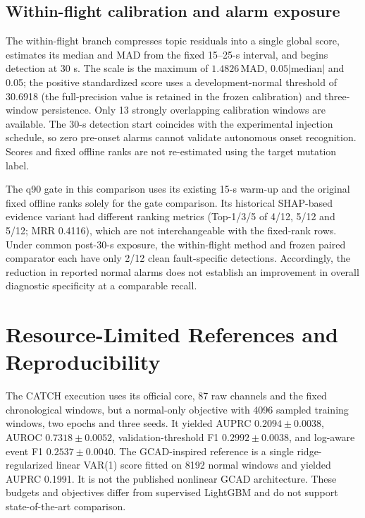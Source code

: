 \documentclass[10pt,a4paper]{article}
\begin{document}
\subsection*{Within-flight calibration and alarm exposure}
The within-flight branch compresses topic residuals into a single global score, estimates its median and MAD from the fixed 15--25-s interval, and begins detection at 30 s. The scale is the maximum of $1.4826\,\mathrm{MAD}$, $0.05|\mathrm{median}|$ and 0.05; the positive standardized score uses a development-normal threshold of 30.6918 (the full-precision value is retained in the frozen calibration) and three-window persistence. Only 13 strongly overlapping calibration windows are available. The 30-s detection start coincides with the experimental injection schedule, so zero pre-onset alarms cannot validate autonomous onset recognition. Scores and fixed offline ranks are not re-estimated using the target mutation label.



The q90 gate in this comparison uses its existing 15-s warm-up and the original fixed offline ranks solely for the gate comparison. Its historical SHAP-based evidence variant had different ranking metrics (Top-1/3/5 of 4/12, 5/12 and 5/12; MRR 0.4116), which are not interchangeable with the fixed-rank rows. Under common post-30-s exposure, the within-flight method and frozen paired comparator each have only 2/12 clean fault-specific detections. Accordingly, the reduction in reported normal alarms does not establish an improvement in overall diagnostic specificity at a comparable recall.
\FloatBarrier

\section{Resource-Limited References and Reproducibility}

The CATCH execution uses its official core, 87 raw channels and the fixed chronological windows, but a normal-only objective with 4096 sampled training windows, two epochs and three seeds. It yielded AUPRC $0.2094\pm0.0038$, AUROC $0.7318\pm0.0052$, validation-threshold F1 $0.2992\pm0.0038$, and log-aware event F1 $0.2537\pm0.0040$. The GCAD-inspired reference is a single ridge-regularized linear VAR(1) score fitted on 8192 normal windows and yielded AUPRC 0.1991. It is not the published nonlinear GCAD architecture. These budgets and objectives differ from supervised LightGBM and do not support state-of-the-art comparison.
\end{document}
